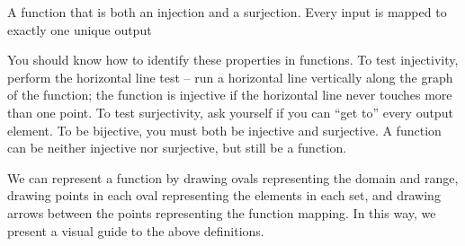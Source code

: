 \documentclass[main.tex]{subfiles}
\begin{document}
\begin{defn}
	A function that is both an injection and a surjection. Every input is mapped to exactly one unique output
\end{defn}

You should know how to identify these properties in functions. To test injectivity, perform the horizontal line test -- run a horizontal line vertically along the graph of the function; the function is injective if the horizontal line never touches more than one point. To test surjectivity, ask yourself if you can ``get to'' every output element. To be bijective, you must both be injective and surjective. A function can be neither injective nor surjective, but still be a function.

We can represent a function by drawing ovals representing the domain and range, drawing points in each oval representing the elements in each set, and drawing arrows between the points representing the function mapping. In this way, we present a visual guide to the above definitions.
\end{document}
